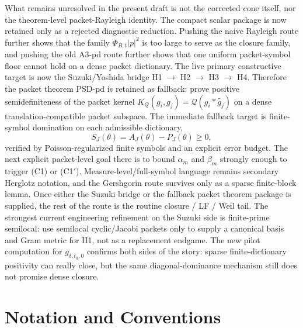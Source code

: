 What remains unresolved in the present draft is not the corrected cone itself, nor the theorem-level packet-Rayleigh identity. The compact scalar package is now retained only as a rejected diagnostic reduction. Pushing the naive Rayleigh route further shows that the family $\Phi_{B,t}|p|^2$ is too large to serve as the closure family, and pushing the old \textup{A3-pd} route further shows that one uniform packet-symbol floor cannot hold on a dense packet dictionary. The live primary constructive target is now the Suzuki/Yoshida bridge \textup{H1} $\to$ \textup{H2} $\to$ \textup{H3} $\to$ \textup{H4}. Therefore the packet theorem \textup{PSD-pd} is retained as fallback: prove positive semidefiniteness of the packet kernel $K_Q(g_i,g_j)=\mathcal Q(g_i * \widetilde{g_j})$ on a dense translation-compatible packet subspace. The immediate fallback target is finite-symbol domination on each admissible dictionary,
\[
  S_J(\theta)=A_J(\theta)-P_J(\theta)\ge0,
\]
verified by Poisson-regularized finite symbols and an explicit error budget. The next explicit packet-level goal there is to bound $\alpha_m$ and $\beta_m$ strongly enough to trigger \textup{(C1)} or \textup{(C1$'$)}. Measure-level/full-symbol language remains secondary Herglotz notation, and the Gershgorin route survives only as a sparse finite-block lemma. Once either the Suzuki bridge or the fallback packet theorem package is supplied, the rest of the route is the routine closure / LF / Weil tail.
The strongest current engineering refinement on the Suzuki side is finite-prime
semilocal: use semilocal cyclic/Jacobi packets only to supply a canonical basis
and Gram metric for \textup{H1}, not as a replacement endgame.
The new pilot computation for $g_{\delta,t_0,0}$ confirms both sides of the
story: sparse finite-dictionary positivity can really close, but the same
diagonal-dominance mechanism still does not promise dense closure.

\section{Notation and Conventions}\label{sec:notation}

